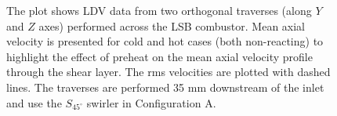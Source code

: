 \begin{figure}[h]

\centering



\caption[Effect of preheat temperature on the LSB flow field - III]{The plot shows LDV data from two orthogonal traverses (along \(Y\) and \(Z\) axes) performed across the LSB combustor. Mean axial velocity is presented for cold and hot cases (both non-reacting) to highlight the effect of preheat on the mean axial velocity profile through the shear layer. The rms velocities are plotted with dashed lines. The traverses are performed 35 mm downstream of the inlet and use the \(S_{45^\circ}\) swirler in Configuration A.}

\label{fig:temperatureLDVTransverse2}

\end{figure}

